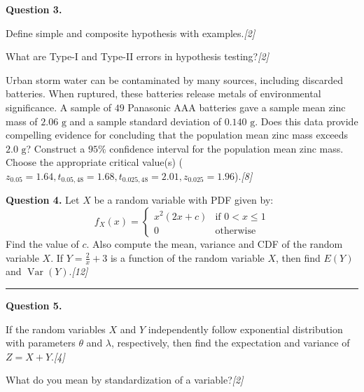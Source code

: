 \documentclass[11pt,a4paper]{article}
\newcommand{\pts}[1]{\hfill   \textit{[#1]}}
\begin{document}
\medskip


\noindent   \textbf{Question 3.}

\begin{parts}
  \item Define simple and composite hypothesis with examples.\pts{2}
  \item What are Type-I and Type-II errors in hypothesis testing?\pts{2}
  \item Urban storm water can be contaminated by many sources, including discarded batteries. When ruptured, these batteries release metals of environmental significance. A sample of $49$ Panasonic AAA batteries gave a sample mean zinc mass of $2.06 \text{ g}$ and a sample standard deviation of $0.140 \text{ g}$. Does this data provide compelling evidence for concluding that the population mean zinc mass exceeds $2.0 \text{ g}$? Construct a $95\%$ confidence interval for the population mean zinc mass. Choose the appropriate critical value(s) ($z_{0.05} = 1.64, t_{0.05, 48} = 1.68, t_{0.025, 48} = 2.01, z_{0.025} = 1.96$).\pts{8}
\end{parts}

\medskip


\noindent   \textbf{Question 4.} Let $X$ be a random variable with PDF given by:
\[ f_X(x) = 
\begin{cases} x^2(2x+c) &  \text{if } 0 < x \le 1 \\ 0 &  \text{otherwise} \end{cases} \]
Find the value of $c$. Also compute the mean, variance and CDF of the random variable $X$. If $Y = \frac{2}{x} + 3$ is a function of the random variable $X$, then find $E(Y)$ and $\operatorname{Var}(Y)$.\pts{12}

\bigskip


\rule{\linewidth}{0.4pt}\smallskip

\medskip


\noindent   \textbf{Question 5.}

\begin{parts}
  \item If the random variables $X$ and $Y$ independently follow exponential distribution with parameters $ \theta$ and $\lambda$, respectively, then find the expectation and variance of $Z = X + Y$.\pts{4}
  \item What do you mean by standardization of a variable?\pts{2}
\end{parts}

\medskip
\end{document}
